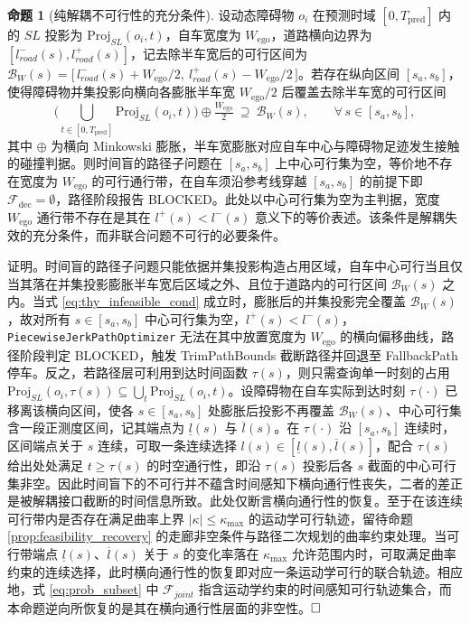 \documentclass[a4paper,11pt]{ctexart}
\theoremstyle{definition}
\newtheorem{proposition}{命题}[section]
\begin{document}
\begin{proposition}[纯解耦不可行性的充分条件]
\label{prop:decoupled_infeasible}
设动态障碍物 $o_i$ 在预测时域 $[0, T_{\text{pred}}]$ 内的 $SL$ 投影为 $\mathrm{Proj}_{SL}(o_i, t)$，自车宽度为 $W_{\text{ego}}$，道路横向边界为 $[l_{road}^{-}(s), l_{road}^{+}(s)]$，记去除半车宽后的可行区间为 $\mathcal{B}_{W}(s) = \bigl[\, l_{road}^{-}(s) + W_{\text{ego}}/2,\ l_{road}^{+}(s) - W_{\text{ego}}/2 \,\bigr]$。若存在纵向区间 $[s_a, s_b]$，使得障碍物并集投影向横向各膨胀半车宽 $W_{\text{ego}}/2$ 后覆盖去除半车宽的可行区间
\begin{equation}
    \Big(\bigcup_{t \in [0, T_{\text{pred}}]} \mathrm{Proj}_{SL}(o_i, t)\Big) \oplus \tfrac{W_{\text{ego}}}{2}\ \supseteq\ \mathcal{B}_{W}(s), \qquad \forall\, s \in [s_a, s_b],
    \label{eq:thy_infeasible_cond}
\end{equation}
其中 $\oplus$ 为横向 Minkowski 膨胀，半车宽膨胀对应自车中心与障碍物足迹发生接触的碰撞判据。则时间盲的路径子问题在 $[s_a, s_b]$ 上中心可行集为空，等价地不存在宽度为 $W_{\text{ego}}$ 的可行通行带，在自车须沿参考线穿越 $[s_a, s_b]$ 的前提下即 $\mathcal{F}_{\text{dec}} = \emptyset$，路径阶段报告 BLOCKED。此处以中心可行集为空为主判据，宽度 $W_{\text{ego}}$ 通行带不存在是其在 $l^{+}(s) < l^{-}(s)$ 意义下的等价表述。该条件是解耦失效的充分条件，而非联合问题不可行的必要条件。
\end{proposition}

证明。时间盲的路径子问题只能依据并集投影构造占用区域，自车中心可行当且仅当其落在并集投影膨胀半车宽后区域之外、且位于道路内的可行区间 $\mathcal{B}_{W}(s)$ 之内。当式 \eqref{eq:thy_infeasible_cond} 成立时，膨胀后的并集投影完全覆盖 $\mathcal{B}_{W}(s)$，故对所有 $s \in [s_a, s_b]$ 中心可行集为空，$l^{+}(s) < l^{-}(s)$，\texttt{PiecewiseJerkPathOptimizer} 无法在其中放置宽度为 $W_{\text{ego}}$ 的横向偏移曲线，路径阶段判定 BLOCKED，触发 TrimPathBounds 截断路径并回退至 FallbackPath 停车。反之，若路径层可利用到达时间函数 $\tau(s)$，则只需查询单一时刻的占用 $\mathrm{Proj}_{SL}(o_i, \tau(s)) \subseteq \bigcup_t \mathrm{Proj}_{SL}(o_i, t)$。设障碍物在自车实际到达时刻 $\tau(\cdot)$ 已移离该横向区间，使各 $s \in [s_a, s_b]$ 处膨胀后投影不再覆盖 $\mathcal{B}_{W}(s)$、中心可行集含一段正测度区间，记其端点为 $\underline{l}(s)$ 与 $\overline{l}(s)$。在 $\tau(\cdot)$ 沿 $[s_a, s_b]$ 连续时，区间端点关于 $s$ 连续，可取一条连续选择 $l(s) \in [\underline{l}(s), \overline{l}(s)]$，配合 $\tau(s)$ 给出处处满足 $t \geq \tau(s)$ 的时空通行性，即沿 $\tau(s)$ 投影后各 $s$ 截面的中心可行集非空。因此时间盲下的不可行并不蕴含时间感知下横向通行性丧失，二者的差正是被解耦接口截断的时间信息所致。此处仅断言横向通行性的恢复。至于在该连续可行带内是否存在满足曲率上界 $|\kappa| \leq \kappa_{\max}$ 的运动学可行轨迹，留待命题 \ref{prop:feasibility_recovery} 的走廊非空条件与路径二次规划的曲率约束处理。当可行带端点 $\underline{l}(s)$、$\overline{l}(s)$ 关于 $s$ 的变化率落在 $\kappa_{\max}$ 允许范围内时，可取满足曲率约束的连续选择，此时横向通行性的恢复即对应一条运动学可行的联合轨迹。相应地，式 \eqref{eq:prob_subset} 中 $\mathcal{F}_{joint}$ 指含运动学约束的时间感知可行轨迹集合，而本命题逆向所恢复的是其在横向通行性层面的非空性。$\hfill\Box$
\end{document}
